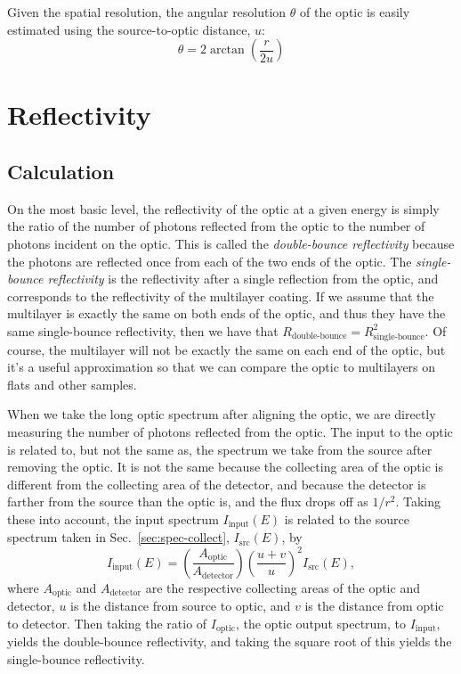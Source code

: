 Given the spatial resolution, the angular resolution $\theta$ of the optic is
easily estimated using the source-to-optic distance, $u$:
\begin{equation}
  \label{eq:ang_res}
  \theta = 2 \arctan{ \left( \frac{r}{2u} \right) }
\end{equation}

\section{Reflectivity}

\subsection{Calculation}

On the most basic level, the reflectivity of the optic at a given energy is
simply the ratio of the number of photons reflected from the optic to the number
of photons incident on the optic. This is called the \textit{double-bounce
  reflectivity} because the photons are reflected once from each of the two ends
of the optic. The \textit{single-bounce reflectivity} is the reflectivity after
a single reflection from the optic, and corresponds to the reflectivity of the
multilayer coating. If we assume that the multilayer is exactly the same on both
ends of the optic, and thus they have the same single-bounce reflectivity, then
we have that $R_\text{double-bounce} = R_\text{single-bounce}^2$. Of course, the
multilayer will not be exactly the same on each end of the optic, but it's a
useful approximation so that we can compare the optic to multilayers on flats
and other samples.

When we take the long optic spectrum after aligning the optic, we are directly
measuring the number of photons reflected from the optic. The input to the optic
is related to, but not the same as, the spectrum we take from the source after
removing the optic. It is not the same because the collecting area of the optic
is different from the collecting area of the detector, and because the detector
is farther from the source than the optic is, and the flux drops off as
$1/r^2$. Taking these into account, the input spectrum $I_\text{input}(E)$ is
related to the source spectrum taken in Sec.~\ref{sec:spec-collect},
$I_\text{src}(E)$, by
\begin{equation}
  \label{eq:src-2-input}
  I_\text{input}(E) = \left( \frac{ A_\text{optic} }{ A_\text{detector} }
  \right) \left( \frac{ u+v }{ u } \right)^2 I_\text{src}(E),
\end{equation}
where $A_\text{optic}$ and $A_\text{detector}$ are the respective collecting
areas of the optic and detector, $u$ is the distance from source to optic, and
$v$ is the distance from optic to detector. Then taking the ratio of
$I_\text{optic}$, the optic output spectrum, to $I_\text{input}$, yields the
double-bounce reflectivity, and taking the square root of this yields the
single-bounce reflectivity.

